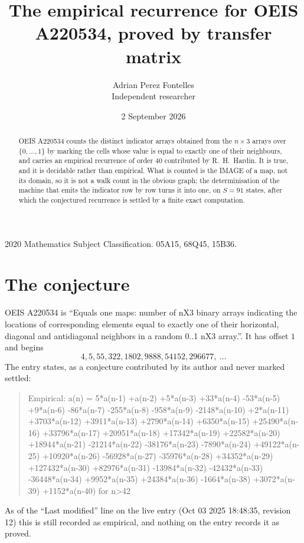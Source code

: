 \documentclass[11pt,a4paper]{article}
\title{The empirical recurrence for OEIS A220534, proved by transfer matrix}
\author{Adrian Perez Fontelles\\ \small Independent researcher}
\date{2 September 2026}
\theoremstyle{plain}
\theoremstyle{definition}
\begin{document}
\maketitle

\begin{abstract}
OEIS A220534 counts the distinct indicator arrays obtained from the $n\times3$ arrays over
$\{0,\dots,1\}$ by marking the cells whose value is equal to exactly one of their neighbours, and carries an
empirical recurrence of order $40$ contributed by R.~H.~Hardin. It is true, and it is
decidable rather than empirical. What is counted is the IMAGE of a map, not its domain, so it
is not a walk count in the obvious graph; the determinisation of the machine that emits the
indicator row by row turns it into one, on $S=91$ states, after which the conjectured
recurrence is settled by a finite exact computation.
\end{abstract}

\noindent\small 2020 Mathematics Subject Classification. 05A15, 68Q45, 15B36.\normalsize

\section{The conjecture}

OEIS A220534 is ``Equals one maps: number of nX3 binary arrays indicating the locations of corresponding elements equal to exactly one of their horizontal, diagonal and antidiagonal neighbors in a random 0..1 nX3 array.''. It has offset $1$ and begins
\[
4, 5, 55, 322, 1802, 9888, 54152, 296677,\ \dots
\]
The entry states, as a conjecture contributed by its author and never marked settled:
\begin{quote}
Empirical: a(n) = 5*a(n-1) +a(n-2) +5*a(n-3) +33*a(n-4) -53*a(n-5) +9*a(n-6) -86*a(n-7) -255*a(n-8) -958*a(n-9) -2148*a(n-10) +2*a(n-11) +3703*a(n-12) +3911*a(n-13) +2790*a(n-14) +6350*a(n-15) +25490*a(n-16) +33796*a(n-17) +20951*a(n-18) +17342*a(n-19) +22582*a(n-20) +18944*a(n-21) -21214*a(n-22) -38176*a(n-23) -7890*a(n-24) +49122*a(n-25) +10920*a(n-26) -56928*a(n-27) -35976*a(n-28) +34352*a(n-29) +127432*a(n-30) +82976*a(n-31) -13984*a(n-32) -42432*a(n-33) -36448*a(n-34) +9952*a(n-35) +24384*a(n-36) -1664*a(n-38) +3072*a(n-39) +1152*a(n-40) for n>42
\end{quote}
As of the ``Last modified'' line on the live entry (Oct 03 2025 18:48:35, revision 12) this is still
recorded as empirical, and nothing on the entry records it as proved.
\end{document}
